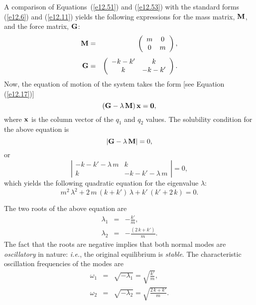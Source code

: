 A comparison of Equations~(\ref{e12.51}) and (\ref{e12.53}) with the standard
forms (\ref{e12.6}) and (\ref{e12.11}) yields the following
expressions for the mass matrix, ${\bf M}$, and the force matrix, ${\bf G}$:
\begin{eqnarray}\label{e12.54}
{\bf M} &=& \left(
\begin{array}{cc}
m& 0\\
0& m\end{array}
\right),\\[1ex]
{\bf G} &=& \left(\begin{array}{cc}
-k-k'& k\\
k& -k-k'\end{array}\right).
\end{eqnarray}
Now, the equation of motion of the system takes the form [see Equation (\ref{e12.17})]
\begin{equation}\label{e12.56}
({\bf G} -\lambda\,{\bf M})\,{\bf x} = {\bf 0},
\end{equation}
where ${\bf x}$ is the column vector of the $q_1$ and $q_2$ values.
The solubility condition for the above equation is
\begin{equation}
\left|{\bf G} - \lambda\,{\bf M}\right| = 0,
\end{equation}
or
\begin{equation}
\left|\begin{array}{cc}
-k-k'-\lambda\,m& k\\[0.5ex]
k&-k-k'-\lambda\,m
\end{array}\right| = 0,
\end{equation}
which yields the following quadratic equation for the eigenvalue $\lambda$:
\begin{equation}
m^2\,\lambda^2 + 2\,m\,(k+k')\,\lambda + k'\,(k'+2\,k) = 0.
\end{equation}

The two roots of the above equation are
\begin{eqnarray}
\lambda_1 &=& - \frac{k'}{m},\\[0.5ex]
\lambda_2 &=& - \frac{(2\,k+k')}{m}.
\end{eqnarray}
The fact that the roots are negative implies that both normal modes are
{\em oscillatory}\/ in nature: {\em i.e.}, the original equilibrium is {\em stable}. 
The characteristic oscillation frequencies of the modes are
\begin{eqnarray}\label{e12.62}
\omega_1 &=& \sqrt{-\lambda_1} = \sqrt{\frac{k'}{m}},\\[0.5ex]
\omega_2 &=& \sqrt{-\lambda_2} = \sqrt{\frac{2\,k+k'}{m}}.\label{e12.63}
\end{eqnarray}

